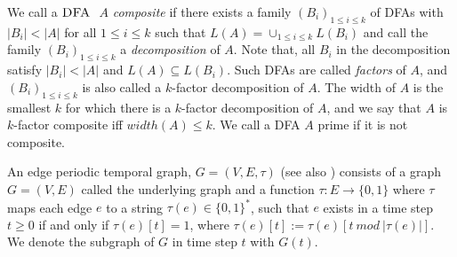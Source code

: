 We call a $\textsc{DFA}~$ $A$ \textit{composite} if there exists a family $(B_i)_{1 \leq i \leq k}$ of DFAs with $|B_i| < |A|$ for all $1 \leq i \leq k$ such that $L(A) = \cup_{1\leq i \leq k} L(B_i)$ and call the family $(B_i)_{1\leq i \leq k}$ a \textit{decomposition} of $A$. Note that, all $B_i$ in the decomposition satisfy $|B_i| < |A|$ and $L(A) \subseteq L(B_i)$. Such DFAs are called \textit{factors} of $A$, and $(B_i)_{1\leq i \leq k}$ is also called a $k$-factor decomposition of $A$. The
width of $A$ is the smallest $k$ for which there is a $k$-factor decomposition of $A$, and we say that $A$ is $k$-factor composite iff $width(A) \leq k$. We call a DFA $A$ prime if it is not composite.

An edge periodic temporal graph, $G = (V, E, \tau)$ (see also \cite{erlebach2020game}) consists of a graph $G = (V, E)$ called the underlying graph and a function $\tau : E \rightarrow \{0, 1\}$ where $\tau$ maps each edge $e$ to a string $\tau(e) \in \{0, 1\}^*$, such that $e$ exists in a time step $t \geq 0$ if and only if $\tau(e)[t] = 1$, where $\tau(e)[t] := \tau(e)[t~ mod~ |\tau(e)|]$. We denote the subgraph of $G$ in time step $t$ with $G(t)$.


